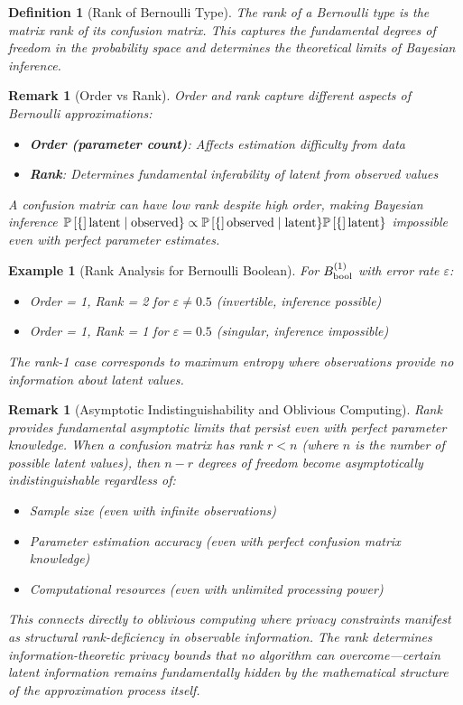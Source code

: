 \documentclass[11pt,final,hidelinks]{article}
\newtheorem{definition}[theorem]{Definition}
\newtheorem{example}[theorem]{Example}
\newtheorem{remark}[theorem]{Remark}
\begin{document}
\begin{definition}[Rank of Bernoulli Type]
The \emph{rank} of a Bernoulli type is the matrix rank of its confusion matrix. This captures the fundamental degrees of freedom in the probability space and determines the theoretical limits of Bayesian inference.
\end{definition}

\begin{remark}[Order vs Rank]
Order and rank capture different aspects of Bernoulli approximations:
\begin{itemize}
    \item \textbf{Order (parameter count)}: Affects estimation difficulty from data
    \item \textbf{Rank}: Determines fundamental inferability of latent from observed values
\end{itemize}
A confusion matrix can have low rank despite high order, making Bayesian inference $\mathbb{P}\left[\{\right]\text{latent} \mid \text{observed}\} \propto \mathbb{P}\left[\{\right]\text{observed} \mid \text{latent}\} \mathbb{P}\left[\{\right]\text{latent}\}$ impossible even with perfect parameter estimates.
\end{remark}

\begin{example}[Rank Analysis for Bernoulli Boolean]
For $B_{\mathrm{bool}}^{(1)}$ with error rate $\varepsilon$:
\begin{itemize}
    \item Order = 1, Rank = 2 for $\varepsilon \neq 0.5$ (invertible, inference possible)
    \item Order = 1, Rank = 1 for $\varepsilon = 0.5$ (singular, inference impossible)
\end{itemize}
The rank-1 case corresponds to maximum entropy where observations provide no information about latent values.
\end{example}

\begin{remark}[Asymptotic Indistinguishability and Oblivious Computing]
Rank provides fundamental asymptotic limits that persist even with perfect parameter knowledge. When a confusion matrix has rank $r < n$ (where $n$ is the number of possible latent values), then $n-r$ degrees of freedom become \emph{asymptotically indistinguishable} regardless of:
\begin{itemize}
    \item Sample size (even with infinite observations)
    \item Parameter estimation accuracy (even with perfect confusion matrix knowledge)
    \item Computational resources (even with unlimited processing power)
\end{itemize}

This connects directly to \emph{oblivious computing} where privacy constraints manifest as structural rank-deficiency in observable information. The rank determines \emph{information-theoretic privacy bounds} that no algorithm can overcome—certain latent information remains fundamentally hidden by the mathematical structure of the approximation process itself.
\end{remark}
\end{document}
